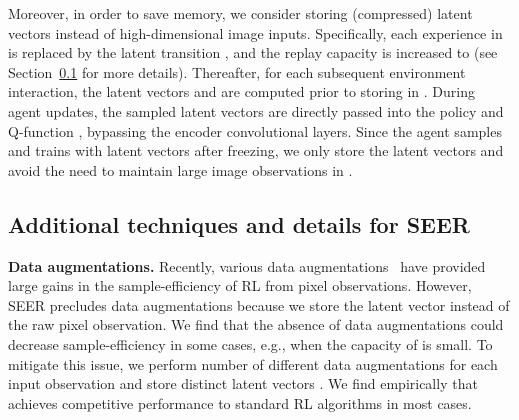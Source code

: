 \documentclass{article}
\begin{document}
Moreover, in order to save memory, 
we consider storing (compressed) latent vectors instead of high-dimensional image inputs.
Specifically, 
each experience in  is replaced by the latent transition , and the replay capacity is increased to  (see Section~\ref{sec:detail} for more details). 
Thereafter, for each subsequent environment interaction, 
the latent vectors  and  are computed prior to storing  in . During agent updates, the sampled latent vectors are directly passed into the policy  and Q-function , bypassing the encoder convolutional layers. Since the agent samples and trains with latent vectors after freezing, we only store the latent vectors and avoid the need to maintain large image observations in .

\subsection{Additional techniques and details for SEER} \label{sec:detail}

\textbf{Data augmentations.} Recently, various data augmentations~\citep{srinivas2020curl, laskin2020reinforcement,kostrikov2020image} have provided large gains in the sample-efficiency of RL from pixel observations.
However, SEER precludes data augmentations because we store the latent vector instead of the raw pixel observation.
We find that the absence of data augmentations could decrease sample-efficiency in some cases, e.g., when the capacity of  is small.
To mitigate this issue,
we perform  number of different data augmentations for each input observation  and store  distinct latent vectors .
We find empirically that  achieves competitive performance to standard RL algorithms in most cases.
\end{document}
